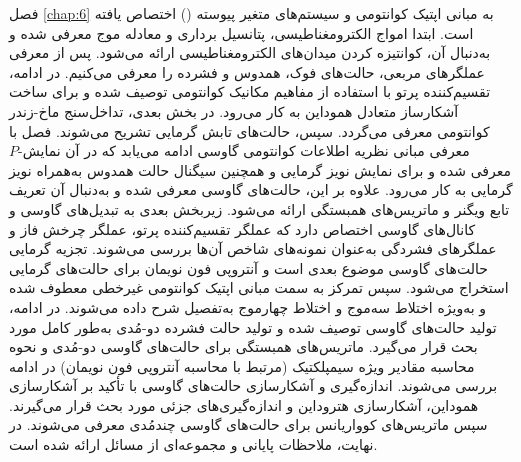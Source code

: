 فصل \ref{chap:6} به مبانی اپتیک کوانتومی و سیستم‌های متغیر پیوسته () اختصاص یافته است. ابتدا امواج الکترومغناطیسی، پتانسیل برداری و معادله موج معرفی شده و به‌دنبال آن، کوانتیزه کردن میدان‌های الکترومغناطیسی ارائه می‌شود. پس از معرفی عملگرهای مربعی، حالت‌های فوک، همدوس و فشرده را معرفی می‌کنیم. در ادامه، تقسیم‌کننده پرتو با استفاده از مفاهیم مکانیک کوانتومی توصیف شده و برای ساخت آشکارساز متعادل هموداین به کار می‌رود. در بخش بعدی، تداخل‌سنج ماخ-زندر کوانتومی معرفی می‌گردد. سپس، حالت‌های تابش گرمایی تشریح می‌شوند. فصل با معرفی مبانی نظریه اطلاعات کوانتومی گاوسی ادامه می‌یابد که در آن نمایش-$P$ معرفی شده و برای نمایش نویز گرمایی و همچنین سیگنال حالت همدوس به‌همراه نویز گرمایی به کار می‌رود. علاوه بر این، حالت‌های گاوسی معرفی شده و به‌دنبال آن تعریف تابع ویگنر و ماتریس‌های همبستگی ارائه می‌شود. زیربخش بعدی به تبدیل‌های گاوسی و کانال‌های گاوسی اختصاص دارد که عملگر تقسیم‌کننده پرتو، عملگر چرخش فاز و عملگرهای فشردگی به‌عنوان نمونه‌های شاخص آن‌ها بررسی می‌شوند. تجزیه گرمایی حالت‌های گاوسی موضوع بعدی است و آنتروپی فون نویمان برای حالت‌های گرمایی استخراج می‌شود. سپس تمرکز به سمت مبانی اپتیک کوانتومی غیرخطی معطوف شده و به‌ویژه اختلاط سه‌موج و اختلاط چهارموج به‌تفصیل شرح داده می‌شوند. در ادامه، تولید حالت‌های گاوسی توصیف شده و تولید حالت فشرده دو-مُدی به‌طور کامل مورد بحث قرار می‌گیرد. ماتریس‌های همبستگی برای حالت‌های گاوسی دو-مُدی و نحوه محاسبه مقادیر ویژه سیمپلکتیک (مرتبط با محاسبه آنتروپی فون نویمان) در ادامه بررسی می‌شوند. اندازه‌گیری و آشکارسازی حالت‌های گاوسی با تأکید بر آشکارسازی هموداین، آشکارسازی هتروداین و اندازه‌گیری‌های جزئی مورد بحث قرار می‌گیرند. سپس ماتریس‌های کوواریانس برای حالت‌های گاوسی چندمُدی معرفی می‌شوند. در نهایت، ملاحظات پایانی و مجموعه‌ای از مسائل ارائه شده است.

